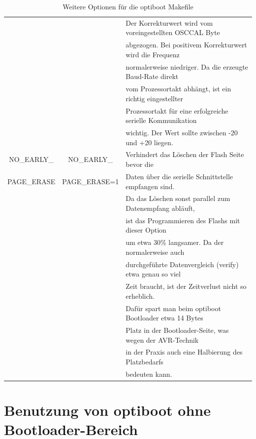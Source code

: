 \begin{table}[H]
\begin{center}
\begin{tabular}{| c | c | l |}
                   &                & Der Korrekturwert wird vom voreingestellten OSCCAL Byte \\
                   &                & abgezogen. Bei positivem Korrekturwert wird die Frequenz \\
                   &                & normalerweise niedriger. Da die erzeugte Baud-Rate direkt \\
                   &                & vom Prozessortakt abhängt, ist ein richtig eingestellter \\
                   &                & Prozessortakt für eine erfolgreiche serielle Kommunikation \\
                   &                & wichtig. Der Wert sollte zwischen -20 und +20 liegen. \\
    \hline
NO\_EARLY\_        &  NO\_EARLY\_   & Verhindert das Löschen der Flash Seite bevor die \\
PAGE\_ERASE        & PAGE\_ERASE=1  & Daten über die serielle Schnittstelle empfangen sind. \\
                   &                & Da das Löschen sonst parallel zum Datenempfang abläuft, \\
                   &                & ist das Programmieren des Flashs mit dieser Option \\
                   &                & um etwa 30\% langsamer. Da der normalerweise auch \\
		   &                & durchgeführte Datenvergleich (verify) etwa genau so viel \\
                   &                & Zeit braucht, ist der Zeitverlust nicht so erheblich. \\
                   &                & Dafür spart man beim optiboot Bootloader etwa 14 Bytes \\
		   &                & Platz in der Bootloader-Seite, was wegen der AVR-Technik \\
		   &                & in der Praxis auch eine Halbierung des Platzbedarfs \\
		   &                & bedeuten kann. \\
    \hline
    \end{tabular}
  \end{center}
  \caption{Weitere Optionen für die optiboot Makefile}
  \label{tab:options3}
\end{table}

\section{Benutzung von optiboot ohne Bootloader-Bereich}

